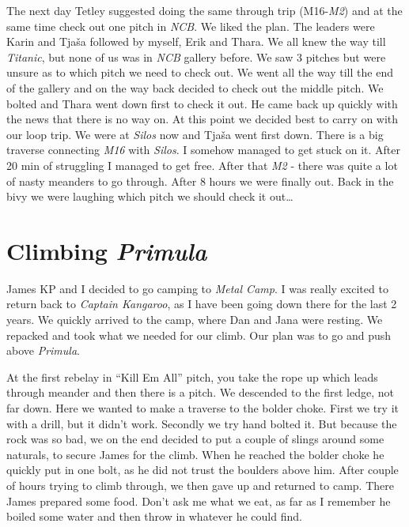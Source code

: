 The next day Tetley suggested doing the same through trip
(M16-\emph{M2}) and at the same time check out one pitch in \emph{NCB}.
We liked the plan. The leaders were Karin and Tjaša followed by myself,
Erik and Thara. We all knew the way till \emph{Titanic}, but none of us
was in \emph{NCB} gallery before. We saw 3 pitches but were unsure as to
which pitch we need to check out. We went all the way till the end of
the gallery and on the way back decided to check out the middle pitch.
We bolted and Thara went down first to check it out. He came back up
quickly with the news that there is no way on. At this point we decided
best to carry on with our loop trip. We were at \emph{Silos} now and
Tjaša went first down. There is a big traverse connecting \emph{M16}
with \emph{Silos}. I somehow managed to get stuck on it. After 20 min of
struggling I managed to get free. After that \emph{M2} - there was quite
a lot of nasty meanders to go through. After 8 hours we were finally
out. Back in the bivy we were laughing which pitch we should check it
out\ldots{}

\attrib{\izi}

\hypertarget{climbing-primula}{%
\section{\texorpdfstring{Climbing
\emph{Primula}}{Climbing Primula}}\label{climbing-primula}}

James KP and I decided to go camping to \emph{Metal Camp}. I was really
excited to return back to \emph{Captain Kangaroo}, as I have been going
down there for the last 2 years. We quickly arrived to the camp, where
Dan and Jana were resting. We repacked and took what we needed for our
climb. Our plan was to go and push above \emph{Primula}.

At the first rebelay in ``Kill Em All'' pitch, you take the rope up
which leads through meander and then there is a pitch. We descended to
the first ledge, not far down. Here we wanted to make a traverse to the
bolder choke. First we try it with a drill, but it didn't work. Secondly
we try hand bolted it. But because the rock was so bad, we on the end
decided to put a couple of slings around some naturals, to secure James
for the climb. When he reached the bolder choke he quickly put in one
bolt, as he did not trust the boulders above him. After couple of hours
trying to climb through, we then gave up and returned to camp. There
James prepared some food. Don't ask me what we eat, as far as I remember
he boiled some water and then throw in whatever he could find.

